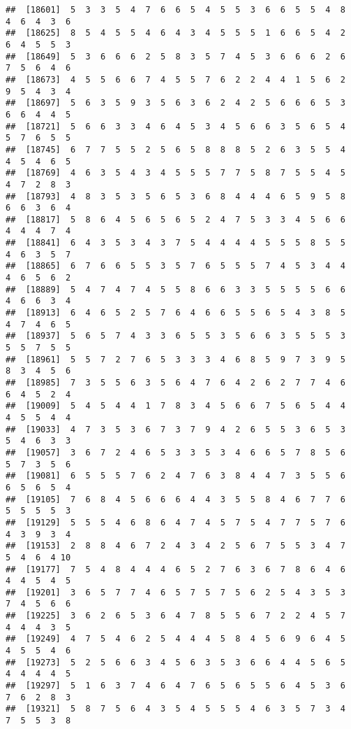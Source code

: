 \documentclass[
]{book}
\begin{document}
\begin{verbatim}
##  [18601]  5  3  3  5  4  7  6  6  5  4  5  5  3  6  6  5  5  4  8  4  6  4  3  6
##  [18625]  8  5  4  5  5  4  6  4  3  4  5  5  5  1  6  6  5  4  2  6  4  5  5  3
##  [18649]  5  3  6  6  6  2  5  8  3  5  7  4  5  3  6  6  6  2  6  7  5  6  4  6
##  [18673]  4  5  5  6  6  7  4  5  5  7  6  2  2  4  4  1  5  6  2  9  5  4  3  4
##  [18697]  5  6  3  5  9  3  5  6  3  6  2  4  2  5  6  6  6  5  3  6  6  4  4  5
##  [18721]  5  6  6  3  3  4  6  4  5  3  4  5  6  6  3  5  6  5  4  5  7  6  5  5
##  [18745]  6  7  7  5  5  2  5  6  5  8  8  8  5  2  6  3  5  5  4  4  5  4  6  5
##  [18769]  4  6  3  5  4  3  4  5  5  5  7  7  5  8  7  5  5  4  5  4  7  2  8  3
##  [18793]  4  8  3  5  3  5  6  5  3  6  8  4  4  4  6  5  9  5  8  6  6  3  6  4
##  [18817]  5  8  6  4  5  6  5  6  5  2  4  7  5  3  3  4  5  6  6  4  4  4  7  4
##  [18841]  6  4  3  5  3  4  3  7  5  4  4  4  4  5  5  5  8  5  5  4  6  3  5  7
##  [18865]  6  7  6  6  5  5  3  5  7  6  5  5  5  7  4  5  3  4  4  4  6  5  6  2
##  [18889]  5  4  7  4  7  4  5  5  8  6  6  3  3  5  5  5  5  6  6  4  6  6  3  4
##  [18913]  6  4  6  5  2  5  7  6  4  6  6  5  5  6  5  4  3  8  5  4  7  4  6  5
##  [18937]  5  6  5  7  4  3  3  6  5  5  3  5  6  6  3  5  5  5  3  5  5  7  5  5
##  [18961]  5  5  7  2  7  6  5  3  3  3  4  6  8  5  9  7  3  9  5  8  3  4  5  6
##  [18985]  7  3  5  5  6  3  5  6  4  7  6  4  2  6  2  7  7  4  6  6  4  5  2  4
##  [19009]  5  4  5  4  4  1  7  8  3  4  5  6  6  7  5  6  5  4  4  4  5  5  4  4
##  [19033]  4  7  3  5  3  6  7  3  7  9  4  2  6  5  5  3  6  5  3  5  4  6  3  3
##  [19057]  3  6  7  2  4  6  5  3  3  5  3  4  6  6  5  7  8  5  6  5  7  3  5  6
##  [19081]  6  5  5  5  7  6  2  4  7  6  3  8  4  4  7  3  5  5  6  6  5  6  5  4
##  [19105]  7  6  8  4  5  6  6  6  4  4  3  5  5  8  4  6  7  7  6  5  5  5  5  3
##  [19129]  5  5  5  4  6  8  6  4  7  4  5  7  5  4  7  7  5  7  6  4  3  9  3  4
##  [19153]  2  8  8  4  6  7  2  4  3  4  2  5  6  7  5  5  3  4  7  5  4  6  4 10
##  [19177]  7  5  4  8  4  4  4  6  5  2  7  6  3  6  7  8  6  4  6  4  4  5  4  5
##  [19201]  3  6  5  7  7  4  6  5  7  5  7  5  6  2  5  4  3  5  3  7  4  5  6  6
##  [19225]  3  6  2  6  5  3  6  4  7  8  5  5  6  7  2  2  4  5  7  4  4  4  3  5
##  [19249]  4  7  5  4  6  2  5  4  4  4  5  8  4  5  6  9  6  4  5  4  5  5  4  6
##  [19273]  5  2  5  6  6  3  4  5  6  3  5  3  6  6  4  4  5  6  5  4  4  4  4  5
##  [19297]  5  1  6  3  7  4  6  4  7  6  5  6  5  5  6  4  5  3  6  7  6  2  8  3
##  [19321]  5  8  7  5  6  4  3  5  4  5  5  5  4  6  3  5  7  3  4  7  5  5  3  8

\end{verbatim}
\end{document}
